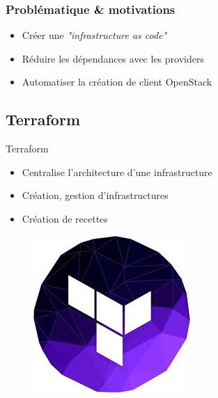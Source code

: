 \documentclass[11pt]{beamer} %
\begin{document}
		
			\begin{frame}
				\frametitle{Problématique \& motivations}
				\begin{itemize}
					\item Créer une \textit{"infrastructure as code"}
					\item Réduire les dépendances avec les providers
					\item Automatiser la création de client OpenStack
				\end{itemize}
			\end{frame}
			
		\subsection{Terraform}
			\begin{frame}{Terraform}
			\begin{itemize}
			\item Centralise l'architecture d'une infrastructure
			\item Création, gestion d'infrastructures
			\item Création de recettes
			\end{itemize}
			\begin{figure}
				\begin{center}
					\includegraphics[scale=0.3]{logoTerraform.jpg}
				\end{center}
			\end{figure}
			\end{frame}
		
		
\end{document}
